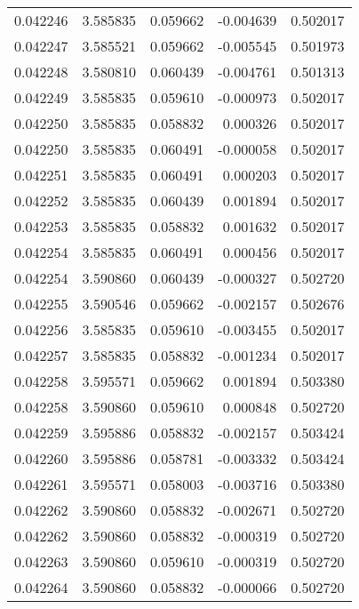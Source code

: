 \begin{tabular}{lrrrr}
0.042246    &  3.585835 &  0.059662 & -0.004639 &             0.502017 \\
0.042247    &  3.585521 &  0.059662 & -0.005545 &             0.501973 \\
0.042248    &  3.580810 &  0.060439 & -0.004761 &             0.501313 \\
0.042249    &  3.585835 &  0.059610 & -0.000973 &             0.502017 \\
0.042250    &  3.585835 &  0.058832 &  0.000326 &             0.502017 \\
0.042250    &  3.585835 &  0.060491 & -0.000058 &             0.502017 \\
0.042251    &  3.585835 &  0.060491 &  0.000203 &             0.502017 \\
0.042252    &  3.585835 &  0.060439 &  0.001894 &             0.502017 \\
0.042253    &  3.585835 &  0.058832 &  0.001632 &             0.502017 \\
0.042254    &  3.585835 &  0.060491 &  0.000456 &             0.502017 \\
0.042254    &  3.590860 &  0.060439 & -0.000327 &             0.502720 \\
0.042255    &  3.590546 &  0.059662 & -0.002157 &             0.502676 \\
0.042256    &  3.585835 &  0.059610 & -0.003455 &             0.502017 \\
0.042257    &  3.585835 &  0.058832 & -0.001234 &             0.502017 \\
0.042258    &  3.595571 &  0.059662 &  0.001894 &             0.503380 \\
0.042258    &  3.590860 &  0.059610 &  0.000848 &             0.502720 \\
0.042259    &  3.595886 &  0.058832 & -0.002157 &             0.503424 \\
0.042260    &  3.595886 &  0.058781 & -0.003332 &             0.503424 \\
0.042261    &  3.595571 &  0.058003 & -0.003716 &             0.503380 \\
0.042262    &  3.590860 &  0.058832 & -0.002671 &             0.502720 \\
0.042262    &  3.590860 &  0.058832 & -0.000319 &             0.502720 \\
0.042263    &  3.590860 &  0.059610 & -0.000319 &             0.502720 \\
0.042264    &  3.590860 &  0.058832 & -0.000066 &             0.502720 \\

\end{tabular}
